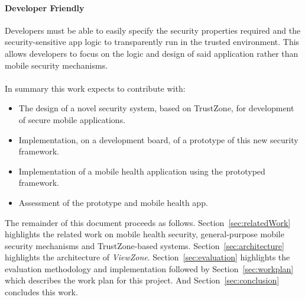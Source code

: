 \paragraph*{\textbf{Developer Friendly\\}} Developers must be able to easily specify the security properties required and the security-sensitive app logic to transparently run in the trusted environment. This allows developers to focus on the logic and design of said application rather than mobile security mechanisms.\\\\
%
%
%
In summary this work expects to contribute with:
\begin{itemize}
	\item The design of a novel security system, based on TrustZone, for development of secure mobile applications.
	\item Implementation, on a development board, of a prototype of this new security framework.
	\item Implementation of a mobile health application using the prototyped framework.
	\item Assessment of the prototype and mobile health app.
\end{itemize}

%
The remainder of this document proceeds as follows. Section~\ref{sec:relatedWork} highlights the related work on mobile health security, general-purpose mobile security mechanisms and TrustZone-based systems. Section~\ref{sec:architecture} highlights the architecture of \emph{ViewZone}. Section~\ref{sec:evaluation} highlights the evaluation methodology and implementation followed by Section~\ref{sec:workplan} which describes the work plan for this project. And Section~\ref{sec:conclusion} concludes this work.

